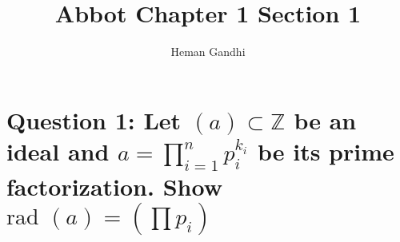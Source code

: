 \documentclass{article}
\title{Abbot Chapter 1 Section 1}
\author{Heman Gandhi}
\newcommand{\Z}{\mathbb{Z}}
\newcommand{\rad}{\text{rad\ }}
\begin{document}
\maketitle

\section{Question 1: Let $(a) \subset \Z$ be an ideal and $a = \prod_{i = 1}^n p_i^{k_i}$ be its prime factorization. Show $\rad (a) = (\prod p_i)$}
\end{document}
